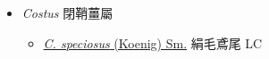 
  \begin{itemize}
 \item[] \textit{Costus} 閉鞘薑屬
                                
  \begin{itemize}
        \item[] \href{http://www.theplantlist.org/tpl1.1/search?q=Costus+speciosus}{\textit{C. speciosus} (Koenig) Sm.}   絹毛鳶尾   LC
  \end{itemize}
  \end{itemize}
